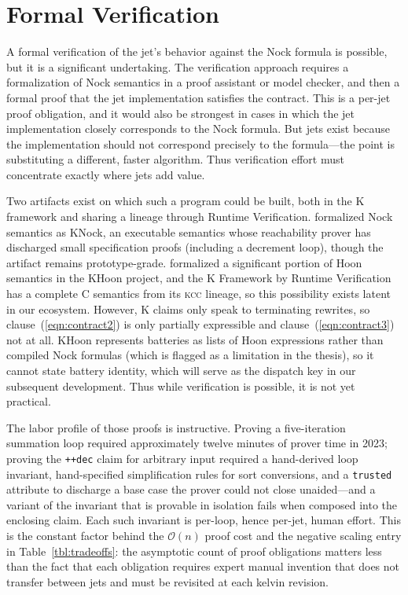 \documentclass[twoside]{article}
\begin{document}
\section{Formal Verification}

A formal verification of the jet's behavior against the Nock formula is possible, but it is a significant undertaking.  The verification approach requires a formalization of Nock semantics in a proof assistant or model checker, and then a formal proof that the jet implementation satisfies the contract.  This is a per-jet proof obligation, and it would also be strongest in cases in which the jet implementation closely corresponds to the Nock formula.  But jets exist because the implementation should not correspond precisely to the formula---the point is substituting a different, faster algorithm.  Thus verification effort must concentrate exactly where jets add value.

Two artifacts exist on which such a program could be built, both in the K framework and sharing a lineage through Runtime Verification.  \citet{Hjort2023} formalized Nock semantics as KNock, an executable semantics whose reachability prover has discharged small specification proofs (including a decrement loop), though the artifact remains prototype-grade.  \citet{Ahl2023} formalized a significant portion of Hoon semantics in the KHoon project, and the K Framework by Runtime Verification has a complete C semantics from its \textsc{kcc} lineage, so this possibility exists latent in our ecosystem.  However, K claims only speak to terminating rewrites, so clause~(\ref{eqn:contract2}) is only partially expressible and clause~(\ref{eqn:contract3}) not at all.  KHoon represents batteries as lists of Hoon expressions rather than compiled Nock formulas (which is flagged as a limitation in the thesis), so it cannot state battery identity, which will serve as the dispatch key in our subsequent development.  Thus while verification is possible, it is not yet practical.

The labor profile of those proofs is instructive.  Proving a five-iteration summation loop required approximately twelve minutes of prover time in 2023; proving the \lstinline[style=inlinecode]{++dec} claim for arbitrary input required a hand-derived loop invariant, hand-specified simplification rules for sort conversions, and a \lstinline[style=inlinecode]{trusted} attribute to discharge a base case the prover could not close unaided---and a variant of the invariant that is provable in isolation fails when composed into the enclosing claim.  Each such invariant is per-loop, hence per-jet, human effort.  This is the constant factor behind the $\mathcal{O}(n)$ proof cost and the negative scaling entry in Table~\ref{tbl:tradeoffs}: the asymptotic count of proof obligations matters less than the fact that each obligation requires expert manual invention that does not transfer between jets and must be revisited at each kelvin revision.
\end{document}

